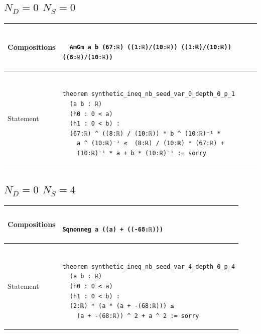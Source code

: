 \documentclass[nohyperref]{article}
\theoremstyle{plain}
\theoremstyle{definition}
\theoremstyle{remark}
\begin{document}
\subsection*{$N_D=0$ $N_S=0$}
\begin{table}[h]
\begin{small}
\begin{tabular}{|p{3.5cm}|p{12.5cm}|} 
  \hline 
  \centering Compositions &
  \begin{minipage}{11 cm}
    \begin{verbatim} 

  AmGm a b (67:ℝ) ((1:ℝ)/(10:ℝ)) ((1:ℝ)/(10:ℝ)) ((8:ℝ)/(10:ℝ))
    \end{verbatim}
  \end{minipage} \\
  \hline 
  \centering Statement &
  \begin{minipage}{11 cm}
    \begin{verbatim} 

theorem synthetic_ineq_nb_seed_var_0_depth_0_p_1
  (a b : ℝ)                                           
  (h0 : 0 < a)                                           
  (h1 : 0 < b) :                                           
  (67:ℝ) ^ ((8:ℝ) / (10:ℝ)) * b ^ (10:ℝ)⁻¹ * 
    a ^ (10:ℝ)⁻¹ ≤  (8:ℝ) / (10:ℝ) * (67:ℝ) +
    (10:ℝ)⁻¹ * a + b * (10:ℝ)⁻¹ := sorry
    \end{verbatim}
  \end{minipage} \\
  \hline
\end{tabular}
\end{small}
\end{table}

\subsection*{$N_D=0$ $N_S=4$}
\begin{table}[h]
\begin{small}
\begin{tabular}{|p{3.5cm}|p{12.5cm}|} 
  \hline 
  \centering Compositions &
  \begin{minipage}{11 cm}
    \begin{verbatim} 

Sqnonneg a ((a) + ((-68:ℝ)))
    \end{verbatim}
  \end{minipage} \\
  \hline 
  \centering Statement &
  \begin{minipage}{11 cm}
    \begin{verbatim} 

theorem synthetic_ineq_nb_seed_var_4_depth_0_p_4
  (a b : ℝ)
  (h0 : 0 < a)
  (h1 : 0 < b) :
  (2:ℝ) * (a * (a + -(68:ℝ))) ≤ 
    (a + -(68:ℝ)) ^ 2 + a ^ 2 := sorry
    \end{verbatim}
  \end{minipage} \\
  \hline
\end{tabular}
\end{small}
\end{table}
\end{document}
